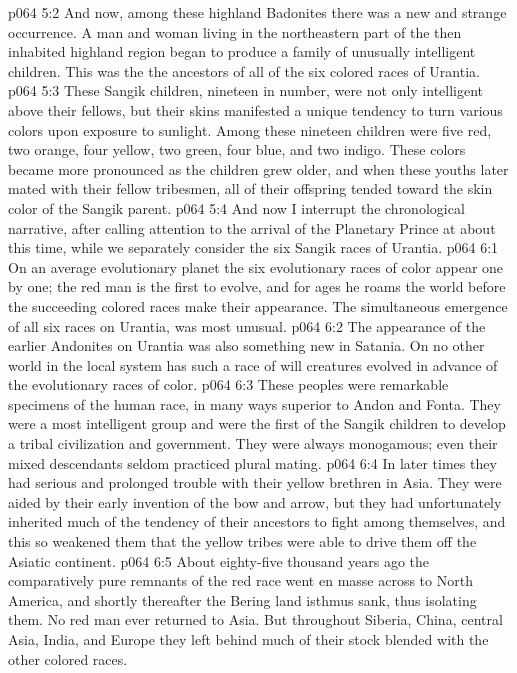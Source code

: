 \vs p064 5:2 And now, among these highland Badonites there was a new and strange occurrence. A man and woman living in the northeastern part of the then inhabited highland region began  to produce a family of unusually intelligent children. This was the  the ancestors of all of the six colored races of Urantia.
\vs p064 5:3 These Sangik children, nineteen in number, were not only intelligent above their fellows, but their skins manifested a unique tendency to turn various colors upon exposure to sunlight. Among these nineteen children were five red, two orange, four yellow, two green, four blue, and two indigo. These colors became more pronounced as the children grew older, and when these youths later mated with their fellow tribesmen, all of their offspring tended toward the skin color of the Sangik parent.
\vs p064 5:4 And now I interrupt the chronological narrative, after calling attention to the arrival of the Planetary Prince at about this time, while we separately consider the six Sangik races of Urantia.
\vs p064 6:1 On an average evolutionary planet the six evolutionary races of color appear one by one; the red man is the first to evolve, and for ages he roams the world before the succeeding colored races make their appearance. The simultaneous emergence of all six races on Urantia,  was most unusual.
\vs p064 6:2 The appearance of the earlier Andonites on Urantia was also something new in Satania. On no other world in the local system has such a race of will creatures evolved in advance of the evolutionary races of color.
\pc \vs p064 6:3 \bibnobreakspace {} These peoples were remarkable specimens of the human race, in many ways superior to Andon and Fonta. They were a most intelligent group and were the first of the Sangik children to develop a tribal civilization and government. They were always monogamous; even their mixed descendants seldom practiced plural mating.
\vs p064 6:4 In later times they had serious and prolonged trouble with their yellow brethren in Asia. They were aided by their early invention of the bow and arrow, but they had unfortunately inherited much of the tendency of their ancestors to fight among themselves, and this so weakened them that the yellow tribes were able to drive them off the Asiatic continent.
\vs p064 6:5 About eighty\hyp{}five thousand years ago the comparatively pure remnants of the red race went en masse across to North America, and shortly thereafter the Bering land isthmus sank, thus isolating them. No red man ever returned to Asia. But throughout Siberia, China, central Asia, India, and Europe they left behind much of their stock blended with the other colored races.
